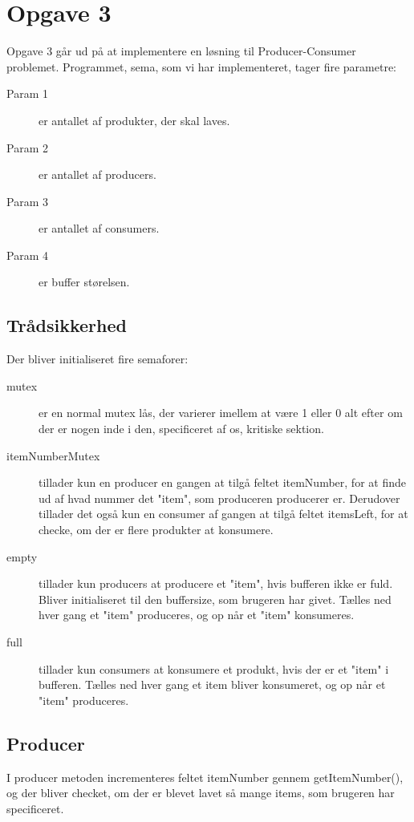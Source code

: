 \section{Opgave 3}
Opgave 3 går ud på at implementere en løsning til Producer-Consumer problemet. Programmet, sema, som vi har implementeret, tager fire parametre:
\begin{description}
\item[Param 1] er antallet af produkter, der skal laves.
\item[Param 2] er antallet af producers.
\item[Param 3] er antallet af consumers.
\item[Param 4] er buffer størelsen.
\end{description}

\subsection{Trådsikkerhed}
Der bliver initialiseret fire semaforer:
\begin{description}
\item[mutex]  er en normal mutex lås, der varierer imellem at være 1 eller 0 alt efter om der er nogen inde i den, specificeret af os, kritiske sektion.
\item[itemNumberMutex] tillader kun en producer en gangen at tilgå feltet itemNumber, for at finde ud af hvad nummer det "item", som produceren producerer er. Derudover tillader det også kun en consumer af gangen at tilgå feltet itemsLeft, for at checke, om der er flere produkter at konsumere.
\item[empty] tillader kun producers at producere et "item", hvis bufferen ikke er fuld. Bliver initialiseret til den buffersize, som brugeren har givet. Tælles ned hver gang et "item" produceres, og op når et "item" konsumeres.
\item[full] tillader kun consumers at konsumere et produkt, hvis der er et "item" i bufferen. Tælles ned hver gang et item bliver konsumeret, og op når et "item" produceres.
\end{description}

\subsection{Producer}
I producer metoden incrementeres feltet itemNumber gennem getItemNumber(), og der bliver checket, om der er blevet lavet så mange items, som brugeren har specificeret.

